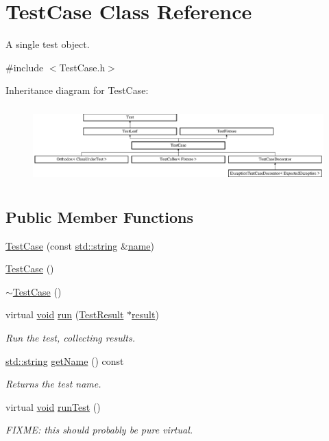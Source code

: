 \hypertarget{class_test_case}{\section{Test\-Case Class Reference}
\label{class_test_case}
}


A single test object.  




{\ttfamily \#include $<$Test\-Case.\-h$>$}

Inheritance diagram for Test\-Case\-:\begin{figure}[H]
\begin{center}
\leavevmode
\includegraphics[height=2.962963cm]{class_test_case}
\end{center}
\end{figure}
\subsection*{Public Member Functions}
\begin{DoxyCompactItemize}
\item 
\hyperlink{class_test_case_af81ee40f823e03175e2f2b965ff3661a}{Test\-Case} (const \hyperlink{glew_8h_ae84541b4f3d8e1ea24ec0f466a8c568b}{std\-::string} \&\hyperlink{fmod__codec_8h_a5c4947d4516dd7cfa3505ce3a648a4ef}{name})
\item 
\hyperlink{class_test_case_ac62aa15cb45a40bdc0b9a1c6554c7e0a}{Test\-Case} ()
\item 
\hyperlink{class_test_case_ae4684f6b106fa323a61dd13be03d7919}{$\sim$\-Test\-Case} ()
\item 
virtual \hyperlink{wglew_8h_aeea6e3dfae3acf232096f57d2d57f084}{void} \hyperlink{class_test_case_a6bc50d62de5b2d0addf9b0167e34b134}{run} (\hyperlink{class_test_result}{Test\-Result} $\ast$\hyperlink{glew_8h_a5fb5836a37f7607602a16ad733ed6357}{result})
\begin{DoxyCompactList}\small\item\em Run the test, collecting results. \end{DoxyCompactList}\item 
\hyperlink{glew_8h_ae84541b4f3d8e1ea24ec0f466a8c568b}{std\-::string} \hyperlink{class_test_case_a833448555e5ce90d826f2b411f47ec3d}{get\-Name} () const 
\begin{DoxyCompactList}\small\item\em Returns the test name. \end{DoxyCompactList}\item 
virtual \hyperlink{wglew_8h_aeea6e3dfae3acf232096f57d2d57f084}{void} \hyperlink{class_test_case_a6b55957ac1dfef01e5d9fa2475676f34}{run\-Test} ()
\begin{DoxyCompactList}\small\item\em F\-I\-X\-M\-E\-: this should probably be pure virtual. \end{DoxyCompactList}\end{DoxyCompactItemize}
